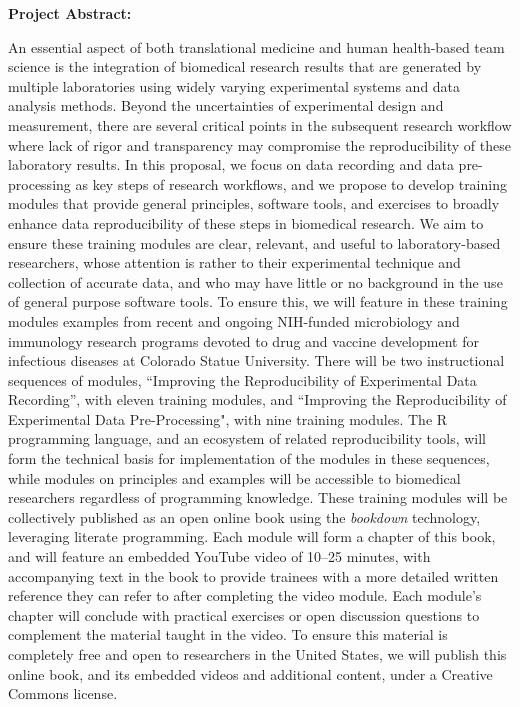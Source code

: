 \documentclass[pdftex,english,11.5pt,parskip=half]{scrartcl}
\begin{document}
\def\bf{\normalfont\bfseries}
\pagestyle{empty}

{\large \textbf{Project Abstract:}}


An essential aspect of both translational medicine and human 
health-based team science is the integration of biomedical research 
results that are generated by multiple laboratories using widely varying 
experimental systems and data analysis methods. Beyond the uncertainties of 
experimental design and measurement, there are several critical points in 
the subsequent research workflow where lack of rigor and transparency 
may compromise the reproducibility of these laboratory results.  In this proposal, 
we focus on data recording and data pre-processing as key steps 
of research workflows, and we propose to develop training modules that 
provide general principles, software tools, and exercises to broadly 
enhance data reproducibility of these steps in biomedical research. We aim to
ensure these training modules are clear, relevant, and useful to laboratory-based 
researchers, whose attention is rather to their experimental technique and collection 
of accurate data, and who may have little or no background in the use of general 
purpose software tools.  To ensure this, we will feature in these training modules 
examples from recent and ongoing NIH-funded microbiology and immunology research 
programs devoted to drug and vaccine development for infectious diseases at 
Colorado Statue University. 
There will be two instructional sequences of modules, ``Improving the Reproducibility of Experimental Data Recording'', with eleven training modules, 
and ``Improving the Reproducibility of Experimental Data Pre-Processing", with nine training modules.
The R programming language, and an ecosystem of
related reproducibility tools, will form the technical basis for implementation
of the modules in these sequences, while modules on principles and examples will be accessible to biomedical researchers regardless of programming knowledge.  
These training modules will be collectively
published as an open online book using the \textit{bookdown} technology, leveraging literate 
programming. Each
module will form a chapter of this book, and will feature an embedded YouTube
video of 10--25 minutes, with accompanying text in the book to provide trainees
with a more detailed written reference they can refer to after completing the
video module.  Each module's chapter will conclude with practical exercises or
open discussion questions to complement the material taught in the video. 
To
ensure this material is completely free and open to researchers in the United
States, we will publish this online book, and its embedded videos and additional content, under a Creative Commons
license.
\end{document}
